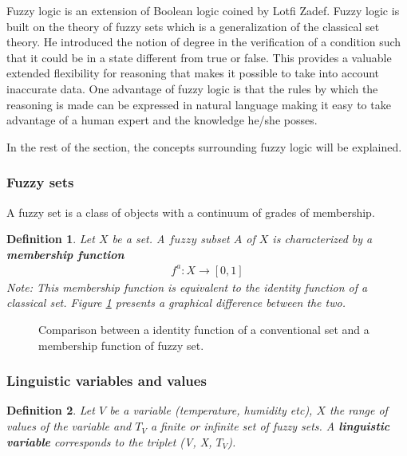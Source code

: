 \documentclass[conference]{IEEEtran}
\newtheorem{definition} {Definition}[section]
\let\Oldsubsubsection\subsubsection
\renewcommand{\subsubsection}{\FloatBarrier\Oldsubsubsection}
\begin{document}
Fuzzy logic is an extension of Boolean logic coined by Lotfi Zadef. Fuzzy logic is built on the theory of
fuzzy sets which is a generalization of the classical set theory. He introduced the notion of degree in the
verification of a condition such that it could be in a state different from true or false. This provides a
valuable extended flexibility for reasoning that makes it possible to take into account inaccurate data.
One advantage of fuzzy logic is that the rules by which the reasoning is made can be expressed in natural
language making it easy to take advantage of a human expert and the knowledge he/she posses.

In the rest of the section, the concepts surrounding fuzzy logic will be explained.
\subsubsection{Fuzzy sets}

A fuzzy set is a class of objects with a continuum of grades of membership\cite{FuzzySets}.

\begin{definition}
\label{def:fuzzye_set}
Let $X$ be a set. A $fuzzy$ subset $A$ of $X$ is characterized by a \textbf{membership function}
\begin{align}
f^{a}: X \rightarrow [0, 1]
\end{align}
Note: This membership function is equivalent to the identity function of a classical set. Figure
\ref{fig:mf_comparison} presents a graphical difference between the two.
\end{definition}

\begin{figure}[h!]
\label{fig:mf_comparison}
\centerline{}
\centerline{}
      \caption[MainModule]{Comparison between a identity function of a conventional set and a membership
                           function of fuzzy set.}
\label{fig:mf_comparison}
\end{figure}

\subsubsection{Linguistic variables and values}
\begin{definition}
\label{def:ling_var}
Let $V$ be a variable (temperature, humidity etc), $X$ the range of values of the variable and $T_{V}$ a
finite or infinite set of fuzzy sets. A \textbf{linguistic variable} corresponds to the triplet (V, X, $T_{V}$).
\end{definition}
\end{document}
